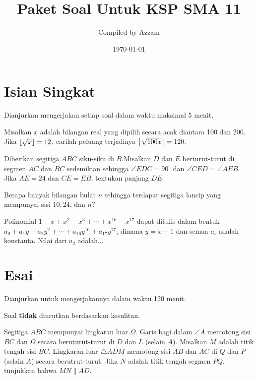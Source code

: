 \documentclass[11pt]{scrartcl}
\begin{document}
	\title{Paket Soal Untuk KSP SMA 11} %
	\date{\today}
	\author{Compiled by Azzam}
	\maketitle
	
	\section{Isian Singkat}
	Dianjurkan mengerjakan setiap soal dalam waktu maksimal 5 menit.
	
	\begin{soalbaru}
	Misalkan $x$ adalah bilangan real yang dipilih secara acak diantara 100 dan 200. Jika $\left\lfloor \sqrt{x} \right\rfloor=12$, carilah peluang terjadinya $\left\lfloor \sqrt{100x} \right\rfloor=120$.
	\end{soalbaru}
	
	\begin{soalbaru}
	Diberikan segitiga $ABC$ siku-siku di $B$.Misalkan $D$ dan $E$ berturut-turut di segmen $AC$ dan $BC$ sedemikian sehingga $\angle EDC= 90^\circ$ dan $\angle CED = \angle AEB$. Jika $AE = 24$ dan $CE=EB$, tentukan panjang $DE$.
	\end{soalbaru}
	
	\begin{soalbaru}
	Berapa banyak bilangan bulat $n$ sehingga terdapat segitiga lancip yang mempunyai sisi $10,24$, dan $n$?
	\end{soalbaru}

	\begin{soalbaru}
	Polinomial $1-x+x^2-x^3+\cdots+x^{16}-x^{17}$ dapat ditulis dalam bentuk $a_0+a_1y+a_2y^2+\cdots +a_{16}y^{16}+a_{17}y^{17}$, dimana $y=x+1$ dan semua $a_i$ adalah konstanta. Nilai dari $a_2$ adalah$\dots$
	\end{soalbaru}

	\section{Esai}
	Dianjurkan untuk mengerjakannya dalam waktu 120 menit.
	
	Soal \textbf{tidak} diurutkan berdasarkan kesulitan. 
	
	\begin{soalbaru}
	Segitiga $ABC$ mempunyai lingkaran luar $\Omega$. Garis bagi dalam $\angle A$ memotong sisi $BC$ dan $\Omega$ secara beruturut-turut di $D$ dan $L$ (selain $A$). Misalkan $M$ adalah titik tengah sisi $BC$. Lingkaran luar $\triangle  ADM$ memotong sisi $AB$ dan $AC$ di $Q$ dan $P$ (selain $A$) secara berutrut-turut. Jika $N$ adalah titik tengah segmen $PQ$, tunjukkan bahwa $MN \parallel AD$. 
	\end{soalbaru}
	
\end{document}
